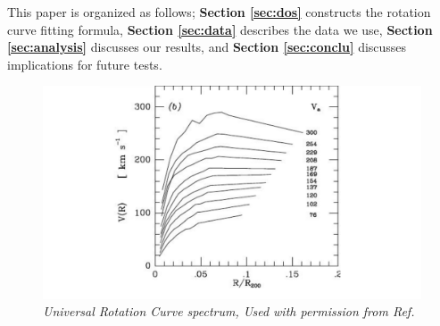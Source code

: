 \documentclass[reprint,%
 amsmath,amssymb,
 aps,
]{revtex4-1}
\begin{document}
   
   
      
  
 
 
 
This paper  is organized as follows;
{\bf Section \ref{sec:dos}} constructs  the rotation curve  fitting formula, 
{\bf Section \ref{sec:data}}   describes  the data we use, 
 {\bf Section \ref{sec:analysis}}   discusses our results, 
 and  {\bf Section \ref{sec:conclu}}   discusses implications for future tests.   
  
  
 \begin{figure}[h!]
     \centering
     \includegraphics[width=\linewidth]{URC}
     \caption{\emph{Universal Rotation Curve spectrum, Used with permission from Ref.\citep{salucci}}}
     \label{fig:URC}
\end{figure}
  

  
    
\end{document}
